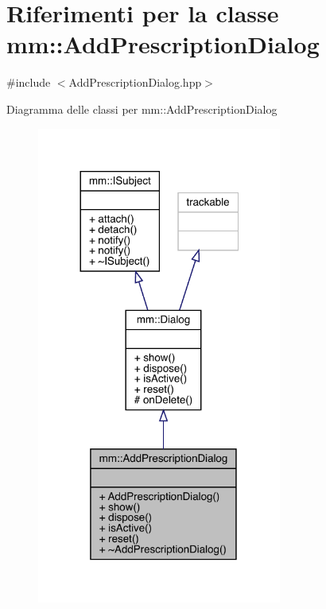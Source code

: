 \hypertarget{classmm_1_1_add_prescription_dialog}{}\section{Riferimenti per la classe mm\+:\+:Add\+Prescription\+Dialog}
\label{classmm_1_1_add_prescription_dialog}


{\ttfamily \#include $<$Add\+Prescription\+Dialog.\+hpp$>$}



Diagramma delle classi per mm\+:\+:Add\+Prescription\+Dialog
\nopagebreak
\begin{figure}[H]
\begin{center}
\leavevmode
\includegraphics[width=228pt]{d5/d29/classmm_1_1_add_prescription_dialog__inherit__graph}
\end{center}
\end{figure}


